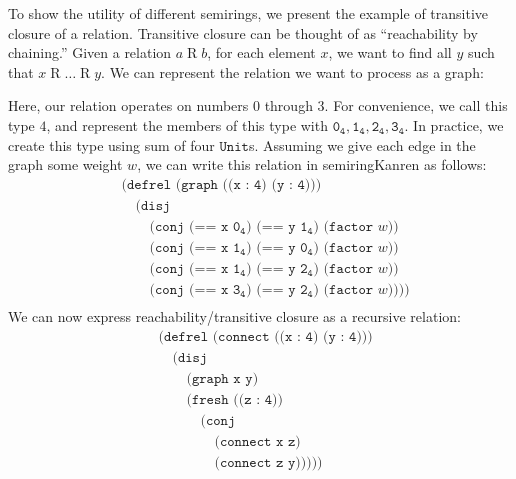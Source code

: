 \documentclass{report}
\theoremstyle{definition}
\begin{document}
To show the utility of different semirings, we present the example of transitive closure of a relation.
Transitive closure can be thought of as ``reachability by chaining.''
Given a relation \(a \mathrel{R} b\), for each element \(x\), we want to find all \(y\) such that \(x \mathrel{R} \dots \mathrel{R} y\).
We can represent the relation we want to process as a graph:
\begin{center}
\end{center}
Here, our relation operates on numbers \(0\) through \(3\).
For convenience, we call this type \(4\), and represent the members of this type with \(\mathtt{0_4},\mathtt{1_4},\mathtt{2_4},\mathtt{3_4}\).
In practice, we create this type using sum of four \(\texttt{Unit}\)s.
Assuming we give each edge in the graph some weight \(w\), we can write this relation in semiringKanren as follows:
\begin{equation}
\begin{aligned}
	& \texttt{(defrel (graph ((x : 4) (y : 4)))} \\
	& \quad \texttt{(disj} \\
	& \quad\quad \texttt{(conj (== x \(\mathtt{0_4}\)) (== y \(\mathtt{1_4}\)) (factor \(w\)))} \\
	& \quad\quad \texttt{(conj (== x \(\mathtt{1_4}\)) (== y \(\mathtt{0_4}\)) (factor \(w\)))} \\
	& \quad\quad \texttt{(conj (== x \(\mathtt{1_4}\)) (== y \(\mathtt{2_4}\)) (factor \(w\)))} \\
	& \quad\quad \texttt{(conj (== x \(\mathtt{3_4}\)) (== y \(\mathtt{2_4}\)) (factor \(w\)))))} \\
\end{aligned}
\end{equation}
We can now express reachability/transitive closure as a recursive relation: 
\begin{equation}
\begin{aligned}
	& \texttt{(defrel (connect ((x : 4) (y : 4)))} \\
	& \quad \texttt{(disj} \\
	& \quad\quad \texttt{(graph x y)} \\
	& \quad\quad \texttt{(fresh ((z : 4))} \\
	& \quad\quad\quad \texttt{(conj} \\
	& \quad\quad\quad\quad \texttt{(connect x z)} \\
	& \quad\quad\quad\quad \texttt{(connect z y)))))} \\
\end{aligned}
\end{equation}
\end{document}

